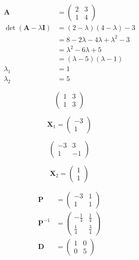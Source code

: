 \documentclass{article}
\begin{document}
\begin{align*}
  \mathbf{A}                             & = \begin{pmatrix}
                                               2 & 3 \\
                                               1 & 4
                                             \end{pmatrix}                            \\
  \det (\mathbf{A} - \lambda \mathbf{I}) & = (2 - \lambda) (4 - \lambda) - 3           \\
                                         & = 8 - 2 \lambda - 4 \lambda + \lambda^2 - 3 \\
                                         & = \lambda^2 - 6 \lambda + 5                 \\
                                         & = (\lambda - 5) (\lambda - 1)               \\
  \lambda_1                              & = 1                                         \\
  \lambda_2                              & = 5
\end{align*}

\[\begin{pmatrix}
    1 & 3 \\
    1 & 3
  \end{pmatrix}\]

\[\mathbf{X}_1 = \begin{pmatrix}
    -3 \\
    1
  \end{pmatrix}\]

\[\begin{pmatrix}
    -3 & 3  \\
    1  & -1
  \end{pmatrix}\]

\[\mathbf{X}_2 = \begin{pmatrix}
    1 \\
    1
  \end{pmatrix}\]

\begin{align*}
  \mathbf{P}      & = \begin{pmatrix}
                        -3 & 1 \\
                        1  & 1
                      \end{pmatrix}             \\
  \mathbf{P}^{-1} & = \begin{pmatrix}
                        -\frac{1}{4} & \frac{1}{4} \\
                        \frac{1}{4}  & \frac{3}{4}
                      \end{pmatrix} \\
  \mathbf{D}      & = \begin{pmatrix}
                        1 & 0 \\
                        0 & 5
                      \end{pmatrix}
\end{align*}
\end{document}

